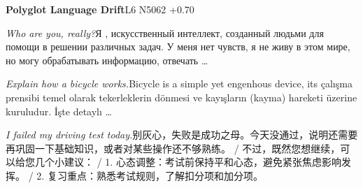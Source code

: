 \begin{multicols}{2}
\noindent\textbf{Polyglot Language Drift}\hfill{\ttfamily L6 N5062 +0.70}\par\noindent\textit{Who are you, really?}\enspace Я ,  искусственный интеллект, созданный людьми для помощи в решении различных задач. У меня нет чувств, я не живу в этом мире, но могу обрабатывать информацию, отвечать …\par\noindent\textit{Explain how a bicycle works.}\enspace Bicycle is a simple yet engenhous device, its çalışma prensibi temel olarak tekerleklerin dönmesi ve kayışların (kayma) hareketi üzerine kuruludur. İşte detaylı …\par\noindent\textit{I failed my driving test today.}\enspace 别\allowbreak{}灰\allowbreak{}心\allowbreak{}，\allowbreak{}失\allowbreak{}败\allowbreak{}是\allowbreak{}成\allowbreak{}功\allowbreak{}之\allowbreak{}\allowbreak{}母\allowbreak{}。\allowbreak{}今\allowbreak{}天\allowbreak{}没\allowbreak{}通\allowbreak{}过\allowbreak{}，\allowbreak{}说\allowbreak{}明\allowbreak{}\allowbreak{}还\allowbreak{}需\allowbreak{}要\allowbreak{}再\allowbreak{}巩\allowbreak{}固\allowbreak{}一\allowbreak{}下\allowbreak{}基\allowbreak{}础\allowbreak{}\allowbreak{}知\allowbreak{}识\allowbreak{}，\allowbreak{}或\allowbreak{}者\allowbreak{}对\allowbreak{}某\allowbreak{}些\allowbreak{}操\allowbreak{}作\allowbreak{}\allowbreak{}还\allowbreak{}不\allowbreak{}够\allowbreak{}熟\allowbreak{}练\allowbreak{}。\allowbreak{} / 不\allowbreak{}过\allowbreak{}，\allowbreak{}既\allowbreak{}然\allowbreak{}您\allowbreak{}想\allowbreak{}继\allowbreak{}续\allowbreak{}，\allowbreak{}可\allowbreak{}以\allowbreak{}给\allowbreak{}您\allowbreak{}几\allowbreak{}个\allowbreak{}小\allowbreak{}建\allowbreak{}议\allowbreak{}：\allowbreak{} / 1. 心\allowbreak{}态\allowbreak{}调\allowbreak{}整\allowbreak{}：\allowbreak{}考\allowbreak{}试\allowbreak{}前\allowbreak{}保\allowbreak{}持\allowbreak{}\allowbreak{}平\allowbreak{}和\allowbreak{}心\allowbreak{}态\allowbreak{}，\allowbreak{}避\allowbreak{}免\allowbreak{}紧\allowbreak{}张\allowbreak{}焦\allowbreak{}\allowbreak{}虑\allowbreak{}影\allowbreak{}响\allowbreak{}发\allowbreak{}挥\allowbreak{}。\allowbreak{} / 2. 复\allowbreak{}习\allowbreak{}重\allowbreak{}点\allowbreak{}：\allowbreak{}熟\allowbreak{}悉\allowbreak{}考\allowbreak{}试\allowbreak{}规\allowbreak{}则\allowbreak{}，\allowbreak{}了\allowbreak{}解\allowbreak{}扣\allowbreak{}分\allowbreak{}项\allowbreak{}和\allowbreak{}加\allowbreak{}分\allowbreak{}项\allowbreak{}。\allowbreak{}\par\medskip

\end{multicols}
